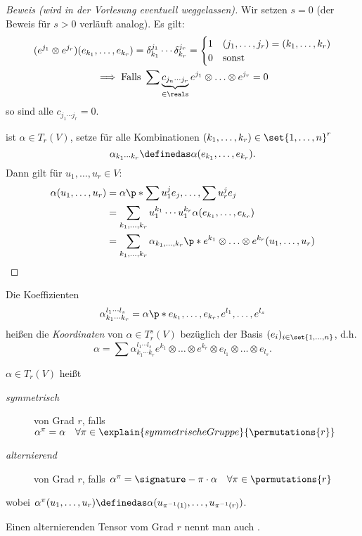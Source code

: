 \begin{proof}[Beweis (wird in der Vorlesung eventuell weggelassen)]
Wir setzen \( s=0 \) (der Beweis für \( s>0 \) verläuft analog).
Es gilt:
\begin{gather*}
    (e^{j_1}\otimes e^{j_r})(e_{k_1},\ldots ,e_{k_r})=\delta_{k_1}^{j_1}\cdots \delta_{k_r}^{j_r}
    =\begin{cases}
        1 & (j_1,\ldots ,j_r)=(k_1,\ldots ,k_r)\\
        0 & \text{sonst}
    \end{cases}\\
    \implies \text{Falls }\sum \underbrace{c_{j_n\cdots j_r}}_{\in\reals}e^{j_1}\otimes \ldots \otimes e^{j_r}=0
\end{gather*}
so sind alle \( c_{j_1\cdots j_r}=0 \).

ist \( \alpha\in T_r(V) \), setze für alle Kombinationen \( (k_1,\ldots ,k_r)\in\set{1,\ldots ,n}^r \)
\begin{equation*}
    \alpha_{k_1\cdots k_r}\definedas \alpha(e_{k_1},\ldots ,e_{k_r}).
\end{equation*}
Dann gilt für \( u_1,\ldots ,u_r\in V \):
\begin{align*}
    \alpha(u_1,\ldots ,u_r)&= \alpha\p*{ \sum u_1^j e_j,\ldots ,\sum u_r^j e_j }\\
    &= \sum_{k_1,\ldots ,k_r}u_1^{k_1}\cdots u_1^{k_r}\alpha(e_{k_1},\ldots ,e_{k_r})\\
    &= \sum_{k_1,\ldots ,k_r}\alpha_{k_1,\ldots ,k_r}\p*{ e^{k_1}\otimes \ldots \otimes e^{k_r} }(u_1,\ldots ,u_r)
\end{align*}
\end{proof}

Die Koeffizienten
\begin{equation*}
\alpha_{k_1\cdots k_r}^{l_1\cdots l_s}=\alpha\p*{ e_{k_1},\ldots ,e_{k_r},e^{l_1},\ldots ,e^{l_s} }
\end{equation*}
heißen die \emph{Koordinaten} von \( \alpha\in T_r^s(V) \) bezüglich der Basis \( (e_i)_{i\in\set{1,\ldots ,n}} \), d.h.
\begin{equation*}
\alpha=\sum \alpha_{k_1\cdots k_r}^{l_1\cdots l_s} e^{k_1}\otimes\ldots \otimes e^{k_r}\otimes e_{l_1}\otimes\ldots \otimes e_{l_s}.
\end{equation*}


\begin{definition}
\( \alpha\in T_r(V) \) heißt
\begin{description}
    \item[\emph{symmetrisch}] von Grad \( r \), falls \( \alpha^\pi=\alpha\quad  \forall \pi\in \explain{symmetrische Gruppe}{\permutations{r}} \)\\
    \item[\emph{alternierend}] von Grad \( r \), falls \( \alpha^\pi=\signature-{\pi} \cdot \alpha\quad  \forall \pi\in \permutations{r}\)
\end{description}
wobei \( \alpha^\pi(u_1,\ldots ,u_r)\definedas \alpha(u_{\pi^{-1}(1)},\ldots ,u_{\pi^{-1}(r)}) \).

Einen alternierenden Tensor vom Grad \( r \) nennt man auch .
\end{definition}

